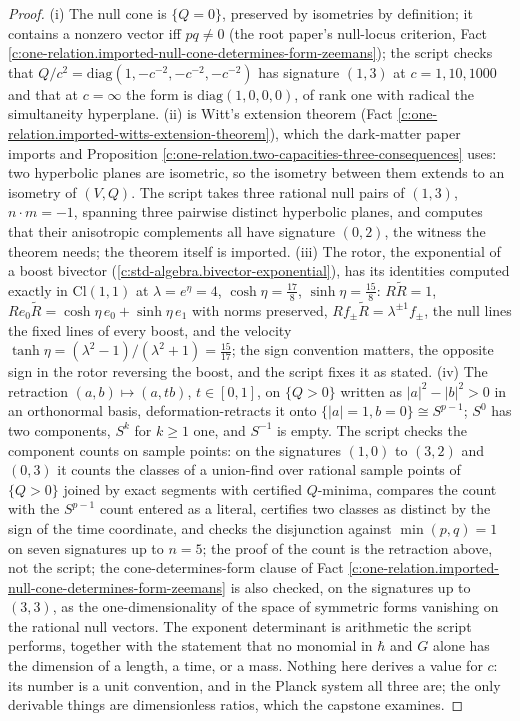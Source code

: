\documentclass[11pt]{article}
\theoremstyle{definition}
\theoremstyle{plain}
\providecommand{\Cl}{}\renewcommand{\Cl}{\mathrm{Cl}}
\begin{document}
\begin{proof}
(i) The null cone is $\{Q = 0\}$, preserved by isometries by definition; it contains a nonzero vector iff $pq \neq 0$ (the root paper's null-locus criterion, Fact \ref{c:one-relation.imported-null-cone-determines-form-zeemans}); the script checks that $Q/c^{2} = \mathrm{diag}(1, -c^{-2}, -c^{-2}, -c^{-2})$ has signature $(1,3)$ at $c = 1, 10, 1000$ and that at $c = \infty$ the form is $\mathrm{diag}(1, 0, 0, 0)$, of rank one with radical the simultaneity hyperplane. (ii) is Witt's extension theorem (Fact \ref{c:one-relation.imported-witts-extension-theorem}), which the dark-matter paper imports and Proposition \ref{c:one-relation.two-capacities-three-consequences} uses: two hyperbolic planes are isometric, so the isometry between them extends to an isometry of $(V, Q)$. The script takes three rational null pairs of $(1,3)$, $n \cdot m = -1$, spanning three pairwise distinct hyperbolic planes, and computes that their anisotropic complements all have signature $(0,2)$, the witness the theorem needs; the theorem itself is imported. (iii) The rotor, the exponential of a boost bivector (\ref{c:std-algebra.bivector-exponential}), has its identities computed exactly in $\Cl(1,1)$ at $\lambda = e^{\eta} = 4$, $\cosh\eta = \tfrac{17}{8}$, $\sinh\eta = \tfrac{15}{8}$: $R\tilde{R} = 1$, $Re_{0}\tilde{R} = \cosh\eta\,e_{0} + \sinh\eta\,e_{1}$ with norms preserved, $Rf_{\pm}\tilde{R} = \lambda^{\pm 1}f_{\pm}$, the null lines the fixed lines of every boost, and the velocity $\tanh\eta = (\lambda^{2} - 1)/(\lambda^{2} + 1) = \tfrac{15}{17}$; the sign convention matters, the opposite sign in the rotor reversing the boost, and the script fixes it as stated. (iv) The retraction $(a, b) \mapsto (a, tb)$, $t \in [0, 1]$, on $\{Q > 0\}$ written as $|a|^{2} - |b|^{2} > 0$ in an orthonormal basis, deformation-retracts it onto $\{|a| = 1, b = 0\} \cong S^{p-1}$; $S^{0}$ has two components, $S^{k}$ for $k \geq 1$ one, and $S^{-1}$ is empty. The script checks the component counts on sample points: on the signatures $(1,0)$ to $(3,2)$ and $(0,3)$ it counts the classes of a union-find over rational sample points of $\{Q > 0\}$ joined by exact segments with certified $Q$-minima, compares the count with the $S^{p-1}$ count entered as a literal, certifies two classes as distinct by the sign of the time coordinate, and checks the disjunction against $\min(p, q) = 1$ on seven signatures up to $n = 5$; the proof of the count is the retraction above, not the script; the cone-determines-form clause of Fact \ref{c:one-relation.imported-null-cone-determines-form-zeemans} is also checked, on the signatures up to $(3,3)$, as the one-dimensionality of the space of symmetric forms vanishing on the rational null vectors. The exponent determinant is arithmetic the script performs, together with the statement that no monomial in $\hbar$ and $G$ alone has the dimension of a length, a time, or a mass. Nothing here derives a value for $c$: its number is a unit convention, and in the Planck system all three are; the only derivable things are dimensionless ratios, which the capstone examines.

\end{proof}
\end{document}
